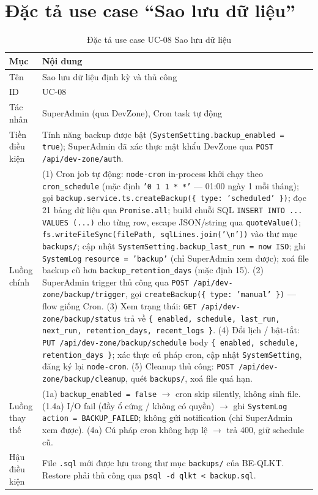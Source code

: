 \documentclass[../DoAn.tex]{subfiles}
\begin{document}
\section{Đặc tả use case ``Sao lưu dữ liệu''}
\label{appendix:uc08}

\begin{table}[H]
\centering
\caption{Đặc tả use case UC-08 Sao lưu dữ liệu}
\label{tab:uc08}
\begin{tabular}{|>{\raggedright\arraybackslash}p{3cm}|p{11cm}|}
\hline
\textbf{Mục} & \textbf{Nội dung} \\ \hline
Tên & Sao lưu dữ liệu định kỳ và thủ công \\ \hline
ID & UC-08 \\ \hline
Tác nhân & SuperAdmin (qua DevZone), Cron task tự động \\ \hline
Tiền điều kiện & Tính năng backup được bật (\texttt{SystemSetting.backup\_enabled = true}); SuperAdmin đã xác thực mật khẩu DevZone qua \texttt{POST /api/dev-zone/auth}. \\ \hline
Luồng chính &
(1) Cron job tự động: \texttt{node-cron} in-process khởi chạy theo \texttt{cron\_schedule} (mặc định \texttt{'0 1 1 * *'} --- 01:00 ngày 1 mỗi tháng); gọi \texttt{backup.service.ts.createBackup(\{ type: 'scheduled' \})}; đọc 21 bảng dữ liệu qua \texttt{Promise.all}; build chuỗi SQL \texttt{INSERT INTO ... VALUES (...)} cho từng row, escape JSON/string qua \texttt{quoteValue()}; \texttt{fs.writeFileSync(filePath, sqlLines.join('\textbackslash n'))} vào thư mục \texttt{backups/}; cập nhật \texttt{SystemSetting.backup\_last\_run = now ISO}; ghi \texttt{SystemLog} \texttt{resource = 'backup'} (chỉ SuperAdmin xem được); xoá file backup cũ hơn \texttt{backup\_retention\_days} (mặc định 15). (2) SuperAdmin trigger thủ công qua \texttt{POST /api/dev-zone/backup/trigger}, gọi \texttt{createBackup(\{ type: 'manual' \})} --- flow giống Cron. (3) Xem trạng thái: \texttt{GET /api/dev-zone/backup/status} trả về \texttt{\{ enabled, schedule, last\_run, next\_run, retention\_days, recent\_logs \}}. (4) Đổi lịch / bật-tắt: \texttt{PUT /api/dev-zone/backup/schedule} body \texttt{\{ enabled, schedule, retention\_days \}}; xác thực cú pháp cron, cập nhật \texttt{SystemSetting}, đăng ký lại \texttt{node-cron}. (5) Cleanup thủ công: \texttt{POST /api/dev-zone/backup/cleanup}, quét \texttt{backups/}, xoá file quá hạn. \\ \hline
Luồng thay thế &
(1a) \texttt{backup\_enabled = false} $\rightarrow$ cron skip silently, không sinh file. (1.4a) I/O fail (đầy ổ cứng / không có quyền) $\rightarrow$ ghi \texttt{SystemLog} \texttt{action = BACKUP\_FAILED}; không gửi notification (chỉ SuperAdmin xem được). (4a) Cú pháp cron không hợp lệ $\rightarrow$ trả 400, giữ schedule cũ. \\ \hline
Hậu điều kiện & File \texttt{.sql} mới được lưu trong thư mục \texttt{backups/} của BE-QLKT. Restore phải thủ công qua \texttt{psql -d qlkt < backup.sql}. \\ \hline
\end{tabular}
\end{table}
\end{document}
